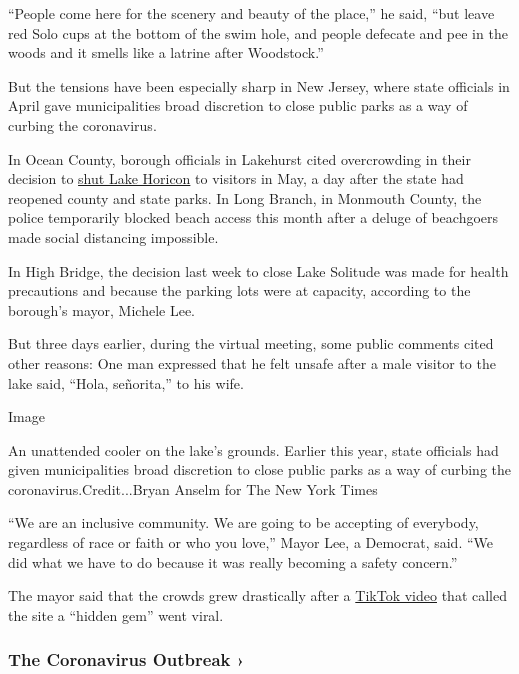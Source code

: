 ``People come here for the scenery and beauty of the place,'' he said,
``but leave red Solo cups at the bottom of the swim hole, and people
defecate and pee in the woods and it smells like a latrine after
Woodstock.''

But the tensions have been especially sharp in New Jersey, where state
officials in April gave municipalities broad discretion to close public
parks as a way of curbing the coronavirus.

In Ocean County, borough officials in Lakehurst cited overcrowding in
their decision to
\href{https://nj1015.com/lake-in-nj-closes-after-one-day-over-crowds-not-social-distancing/}{shut
Lake Horicon} to visitors in May, a day after the state had reopened
county and state parks. In Long Branch, in Monmouth County, the police
temporarily blocked beach access this month after a deluge of beachgoers
made social distancing impossible.

In High Bridge, the decision last week to close Lake Solitude was made
for health precautions and because the parking lots were at capacity,
according to the borough's mayor, Michele Lee.

But three days earlier, during the virtual meeting, some public comments
cited other reasons: One man expressed that he felt unsafe after a male
visitor to the lake said, ``Hola, señorita,'' to his wife.

Image

An unattended cooler on the lake's grounds. Earlier this year, state
officials had given municipalities broad discretion to close public
parks as a way of curbing the coronavirus.Credit...Bryan Anselm for The
New York Times

``We are an inclusive community. We are going to be accepting of
everybody, regardless of race or faith or who you love,'' Mayor Lee, a
Democrat, said. ``We did what we have to do because it was really
becoming a safety concern.''

The mayor said that the crowds grew drastically after a
\href{https://www.tiktok.com/@dkaur171/video/6845337773726043398}{TikTok
video} that called the site a ``hidden gem'' went viral.

\href{https://www.nytimes.com/news-event/coronavirus?action=click\&pgtype=Article\&state=default\&region=MAIN_CONTENT_3\&context=storylines_faq}{}

\hypertarget{the-coronavirus-outbreak-}{%
\subsubsection{The Coronavirus Outbreak
›}\label{the-coronavirus-outbreak-}}

